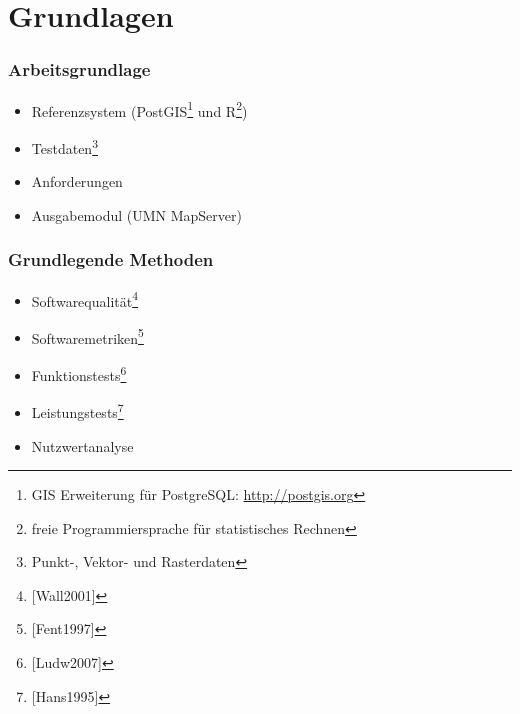 \documentclass{beamer}
\begin{document}
\section{Grundlagen}
\begin{frame}\frametitle{Arbeitsgrundlage} 
\begin{itemize}
\item Referenzsystem (PostGIS\footnote{GIS Erweiterung für PostgreSQL: \url{http://postgis.org}} und R\footnote{freie Programmiersprache für statistisches Rechnen}) %
\item Testdaten\footnote{Punkt-, Vektor- und Rasterdaten}

\item Anforderungen
\item Ausgabemodul (UMN MapServer)
\end{itemize}
\end{frame}

\begin{frame}\frametitle{Grundlegende Methoden} 
\begin{itemize}
\item Softwarequalität\footnote{[Wall2001]} %
\item Softwaremetriken\footnote{[Fent1997]}
\item Funktionstests\footnote{[Ludw2007]}
\item Leistungstests\footnote{[Hans1995]}
\item Nutzwertanalyse
%
\end{itemize}
\end{frame}

% 
\end{document}
